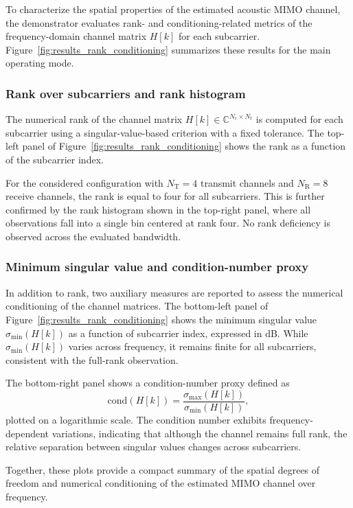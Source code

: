 To characterize the spatial properties of the estimated acoustic MIMO channel, the demonstrator evaluates rank- and conditioning-related metrics of the frequency-domain channel matrix $H[k]$ for each subcarrier. Figure~\ref{fig:results_rank_conditioning} summarizes these results for the main operating mode.

\subsubsection{Rank over subcarriers and rank histogram}
\label{sec:results_rank_hist}

The numerical rank of the channel matrix $H[k] \in \mathbb{C}^{N_r \times N_t}$ is computed for each subcarrier using a singular-value-based criterion with a fixed tolerance. The top-left panel of Figure~\ref{fig:results_rank_conditioning} shows the rank as a function of the subcarrier index.

For the considered configuration with $N_{\mathrm{T}} = 4$ transmit channels and $N_{\mathrm{R}} = 8$ receive channels, the rank is equal to four for all subcarriers. This is further confirmed by the rank histogram shown in the top-right panel, where all observations fall into a single bin centered at rank four. No rank deficiency is observed across the evaluated bandwidth.

\subsubsection{Minimum singular value and condition-number proxy}
\label{sec:results_conditioning}

In addition to rank, two auxiliary measures are reported to assess the numerical conditioning of the channel matrices. The bottom-left panel of Figure~\ref{fig:results_rank_conditioning} shows the minimum singular value $\sigma_{\min}(H[k])$ as a function of subcarrier index, expressed in dB. While $\sigma_{\min}(H[k])$ varies across frequency, it remains finite for all subcarriers, consistent with the full-rank observation.

The bottom-right panel shows a condition-number proxy defined as
\[
\mathrm{cond}(H[k]) = \frac{\sigma_{\max}(H[k])}{\sigma_{\min}(H[k])},
\]
plotted on a logarithmic scale. The condition number exhibits frequency-dependent variations, indicating that although the channel remains full rank, the relative separation between singular values changes across subcarriers.

Together, these plots provide a compact summary of the spatial degrees of freedom and numerical conditioning of the estimated MIMO channel over frequency.

